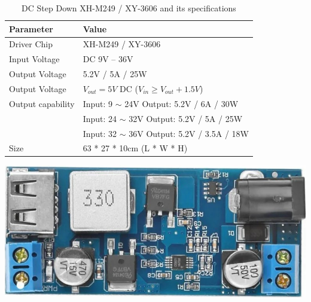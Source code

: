 \vspace{-0.4em}


\begin{table}[h]
    \begin{minipage}{0.6\textwidth}
        \centering
        \renewcommand{\arraystretch}{2.0}
        \setlength{\tabcolsep}{4.4pt}
        \footnotesize
        \begin{tabular}{|p{4.0cm}|p{5.0cm}|}
          \hline
          \rowcolor[gray]{0.8} 
          \textbf{Parameter} & \textbf{Value} \\
          \hline
          Driver Chip &  XH-M249 / XY-3606 \\
          \hline
          Input Voltage & DC 9V -- 36V \\
          \hline
          Output Voltage & 5.2V / 5A / 25W \\
          \hline
          Output Voltage & $V_{out} = 5V$ DC ($V_{in} \geq V_{out} + 1.5V$) \\
          \hline
          Output capability & Input: 9 $\sim$ 24V  \newline Output: 5.2V / 6A / 30W \\
          
           & Input: 24 $\sim$ 32V \newline  Output: 5.2V / 5A / 25W \\
          
           & Input: 32 $\sim$ 36V \newline Output: 5.2V / 3.5A / 18W \\
          \hline
          Size & 63 * 27 * 10cm (L * W * H) \\
          \hline
        \end{tabular}
    \end{minipage}
    \begin{minipage}{0.36\textwidth}
        \centering
        \includegraphics[width=\linewidth, angle=90]{pics/xr.png}
    \end{minipage}\hfill
    \caption{DC Step Down XH-M249 / XY-3606 and its specifications}\label{tab:l298n}
\end{table}




